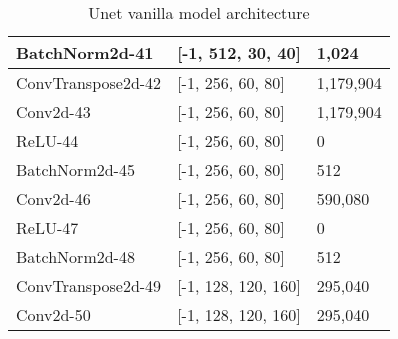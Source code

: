 \begin{table}[]
\begin{center}
\begin{tabular}{| l | l | p{3cm} |}
    			BatchNorm2d-41     & {[}-1, 512, 30, 40{]}   & 1,024     \\ \hline
    			ConvTranspose2d-42 & {[}-1, 256, 60, 80{]}   & 1,179,904 \\ \hline
    			Conv2d-43          & {[}-1, 256, 60, 80{]}   & 1,179,904 \\ \hline
    			ReLU-44            & {[}-1, 256, 60, 80{]}   & 0         \\ \hline
    			BatchNorm2d-45     & {[}-1, 256, 60, 80{]}   & 512       \\ \hline
    			Conv2d-46          & {[}-1, 256, 60, 80{]}   & 590,080   \\ \hline
    			ReLU-47            & {[}-1, 256, 60, 80{]}   & 0         \\ \hline
    			BatchNorm2d-48     & {[}-1, 256, 60, 80{]}   & 512       \\ \hline
    			ConvTranspose2d-49 & {[}-1, 128, 120, 160{]} & 295,040   \\ \hline
    			Conv2d-50          & {[}-1, 128, 120, 160{]} & 295,040   \\ \hline
    		\end{tabular}
    		\caption{Unet vanilla model architecture}
    		\label{table:unet_vanilla_model_1}
    	\end{center}
    \end{table}
    
